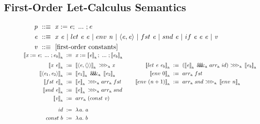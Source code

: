 \documentclass{llncs}
\newcommand{\smallmathfont}{\fontsize{7.5}{9}\selectfont}
\newcommand{\arrowarr}{\ensuremath{arr}}
\newcommand{\arrowcomp}{\ensuremath{{>}\mspace{-6mu}{>}\mspace{-6mu}{>}}}
\newcommand{\arrowpair}{\ensuremath{\mathit{\&\mspace{-7.5mu}\&\mspace{-7.5mu}\&}}}
\newcommand{\gen}{_\mathrm{a}}
\begin{document}
\subsection{First-Order Let-Calculus Semantics}

\begin{figure}[!tb]\centering
\smallmathfont
\begin{align*}
	\mathit{p} &\ ::\equiv \ \mathit{x := e};\ ...\ ; \mathit{e}
\\
	\mathit{e} &\ ::\equiv \ \mathit{x~e}\ |\ let~\mathit{e~e}\ |\ env~\mathit{n}\ |\ \mathit{\pair{e,e}}\ |\ fst~\mathit{e}\ |\ snd~\mathit{e}\ |\ if~\mathit{e~e~e}\ |\ \mathit{v}
\\
	\mathit{v} &\ ::\equiv \ \text{[first-order constants]}
\\[-6pt]
\end{align*}
\begin{align*}
\begin{aligned}[t]
	\meaningof{\mathit{x} := \mathit{e};\ ...\ ; \mathit{e_b}}\gen &\ :\equiv\
		\mathit{x} := \meaningof{\mathit{e}}\gen;\ ...\ ; \meaningof{\mathit{e_b}}\gen
\\[3pt]
	\meaningof{\mathit{x}~\mathit{e}}\gen &\ :\equiv\
		\meaningof{\pair{\mathit{e},\pair{}}}\gen~\arrowcomp\gen~\mathit{x}
\\
	\meaningof{\pair{\mathit{e}_1,\mathit{e}_2}}\gen &\ :\equiv\
		\meaningof{\mathit{e}_1}\gen~\arrowpair\gen~\meaningof{\mathit{e}_2}\gen
\\
	\meaningof{fst~\mathit{e}}\gen &\ :\equiv\
		\meaningof{\mathit{e}}\gen~\arrowcomp\gen~\arrowarr\gen~fst
\\
	\meaningof{snd~\mathit{e}}\gen &\ :\equiv\
		\meaningof{\mathit{e}}\gen~\arrowcomp\gen~\arrowarr\gen~snd
\\
	\meaningof{\mathit{v}}\gen &\ :\equiv\ \arrowarr\gen~(const~\mathit{v})
\\[6pt]
	id &\ := \ \fun{a} a
\\
	const~b &\ := \ \fun{a} b
\\
\end{aligned}
&\tab\tab\ 
\begin{aligned}[t]
\\[3pt]
	\meaningof{let~\mathit{e}~\mathit{e_b}}\gen &\ :\equiv\ 
		(\meaningof{\mathit{e}}\gen~\arrowpair\gen~\arrowarr\gen~id)~
			\arrowcomp\gen~
		\meaningof{\mathit{e_b}}\gen
\\
	\meaningof{env~0}\gen &\ :\equiv\ \arrowarr\gen~fst
\\
	\meaningof{env~(\mathit{n}+1)}\gen &\ :\equiv\ \arrowarr\gen~snd~\arrowcomp\gen~\meaningof{env~\mathit{n}}\gen

\end{aligned}
\end{align*}
\end{figure}
\end{document}
